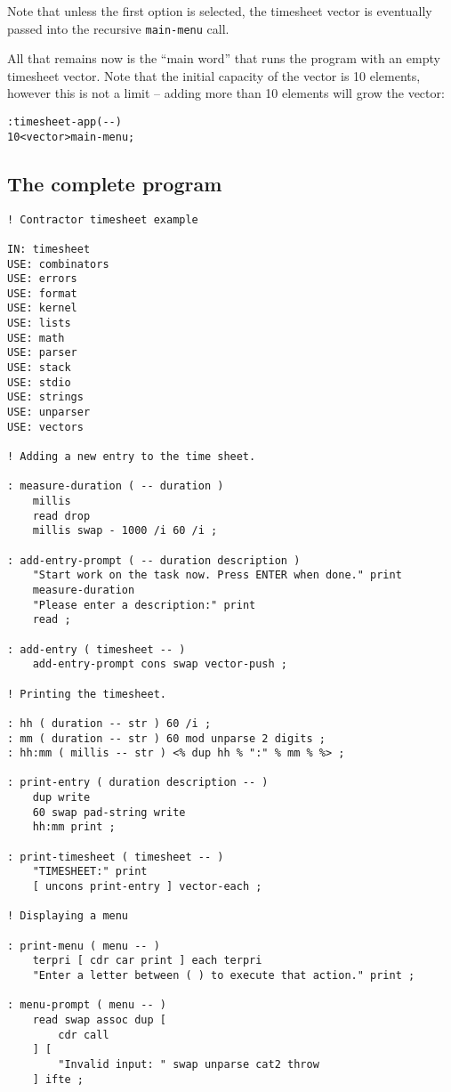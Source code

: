 \documentclass[english]{article}
\begin{document}
{Note that unless the first option is selected, the timesheet vector is eventually passed into the recursive \texttt{main-menu} call.

All that remains now is the ``main word'' that runs the program with an empty timesheet vector. Note that the initial capacity of the vector is 10 elements, however this is not a limit -- adding more than 10 elements will grow the vector:

\begin{alltt}
: timesheet-app ( -{}- )
    10 <vector> main-menu ;
\end{alltt}

\subsection{The complete program}

\begin{verbatim}
! Contractor timesheet example

IN: timesheet
USE: combinators
USE: errors
USE: format
USE: kernel
USE: lists
USE: math
USE: parser
USE: stack
USE: stdio
USE: strings
USE: unparser
USE: vectors

! Adding a new entry to the time sheet.

: measure-duration ( -- duration )
    millis
    read drop
    millis swap - 1000 /i 60 /i ;

: add-entry-prompt ( -- duration description )
    "Start work on the task now. Press ENTER when done." print
    measure-duration
    "Please enter a description:" print
    read ;

: add-entry ( timesheet -- )
    add-entry-prompt cons swap vector-push ;

! Printing the timesheet.

: hh ( duration -- str ) 60 /i ;
: mm ( duration -- str ) 60 mod unparse 2 digits ;
: hh:mm ( millis -- str ) <% dup hh % ":" % mm % %> ;

: print-entry ( duration description -- )
    dup write
    60 swap pad-string write
    hh:mm print ;

: print-timesheet ( timesheet -- )
    "TIMESHEET:" print
    [ uncons print-entry ] vector-each ;

! Displaying a menu

: print-menu ( menu -- )
    terpri [ cdr car print ] each terpri
    "Enter a letter between ( ) to execute that action." print ;

: menu-prompt ( menu -- )
    read swap assoc dup [
        cdr call
    ] [
        "Invalid input: " swap unparse cat2 throw
    ] ifte ;


\end{verbatim}}
\end{document}
